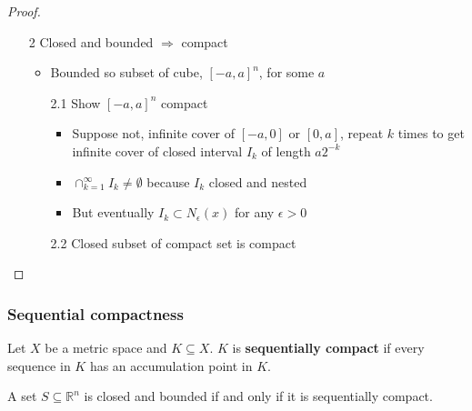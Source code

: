 \documentclass[compress]{beamer}
\def\R{\mathbb{R}}
\begin{document}
\begin{frame}
  \begin{proof}
    \begin{itemize}
    \item[2] Closed and bounded $\Rightarrow$ compact
      \begin{itemize}
      \item Bounded so subset of cube, $[-a,a]^n$, for some $a$
      \item[2.1] Show $[-a,a]^n$ compact
        \begin{itemize}
        \item Suppose not, infinite cover of $[-a,0]$ or $[0,a]$,
          repeat $k$ times to get infinite cover of closed interval
          $I_k$ of length $a 2^{-k}$
        \item $\cap_{k=1}^\infty I_k \neq \emptyset$ because $I_k$
          closed and nested
        \item But eventually $I_k \subset N_\epsilon(x)$ for any
          $\epsilon>0$  
        \end{itemize}
      \item[2.2] Closed subset of compact set is compact
      \end{itemize}
    \end{itemize}
  \end{proof}
\end{frame}

\begin{frame}
  \frametitle{Sequential compactness}
  \begin{definition}
    Let $X$ be a metric space and $K \subseteq X$. $K$ is
    \textbf{sequentially compact} if every sequence in $K$ has an
    accumulation point in $K$.
  \end{definition}
  \begin{theorem} \label{thm:bw}
    A set $S \subseteq \R^n$ is closed and bounded if and only if it is
    sequentially compact. 
  \end{theorem}
\end{frame}
\end{document}
